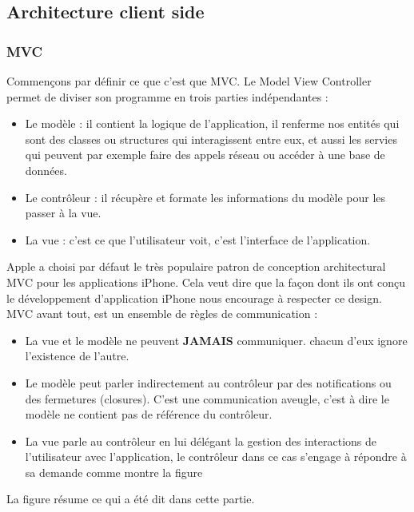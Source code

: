 \subsection{Architecture client side}
\subsubsection{MVC} %
 \label{ssub:mvc}
 Commençons par définir ce que c'est que MVC. Le Model View Controller permet de diviser son programme en trois parties indépendantes :
 \begin{itemize}
 	\item Le modèle : il contient la logique de l'application, il renferme nos entités qui sont des classes ou structures qui interagissent entre eux, et aussi les servies qui peuvent par exemple faire des appels réseau ou accéder à une base de données.
 	\item Le contrôleur : il récupère  et formate les informations du modèle pour les passer à la vue.
 	\item La vue : c'est ce que l'utilisateur voit, c'est l'interface de l'application.
 \end{itemize}
 Apple a choisi par défaut le très populaire patron de conception architectural MVC pour les applications iPhone\cite{mvc}. Cela veut dire que la façon dont ils ont conçu le développement d'application iPhone nous encourage à respecter ce design. \newline
 MVC avant tout, est un ensemble de règles de communication :
 \begin{itemize}
 	\item La vue et le modèle ne peuvent \textbf{JAMAIS} communiquer. chacun d'eux ignore l’existence de l'autre.
 	\item Le modèle peut parler indirectement au contrôleur par des notifications ou des fermetures (closures). C'est une communication aveugle, c'est à dire le modèle ne contient pas de référence du contrôleur.
 	\item La vue parle au contrôleur en lui délégant la gestion des interactions de l'utilisateur avec l'application, le contrôleur dans ce cas s'engage à répondre à sa demande comme montre la figure 
 	\newline
 \end{itemize}
 La figure résume ce qui a été dit dans cette partie.

